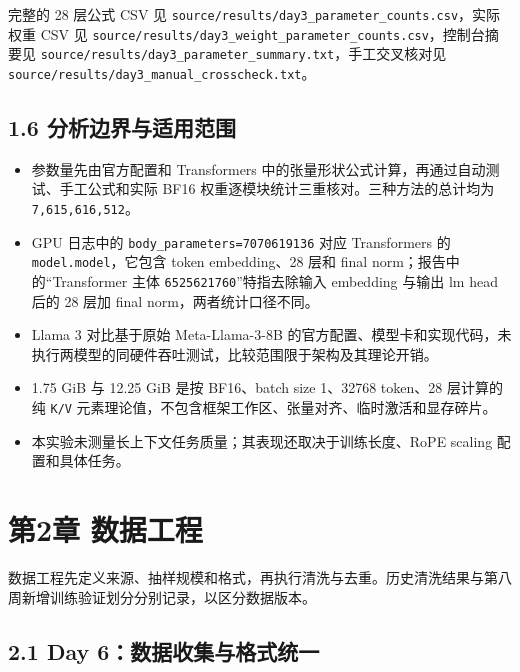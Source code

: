 \documentclass[UTF8,fontset=fandol,a4paper,11pt]{ctexart}
\providecommand{\tightlist}{\setlength{\itemsep}{0pt}\setlength{\parskip}{0pt}}
\begin{document}
完整的 28 层公式 CSV 见
\nolinkurl{source/results/day3_parameter_counts.csv}，实际权重 CSV 见
\nolinkurl{source/results/day3_weight_parameter_counts.csv}，控制台摘要见
\nolinkurl{source/results/day3_parameter_summary.txt}，手工交叉核对见
\nolinkurl{source/results/day3_manual_crosscheck.txt}。

\subsection{1.6 分析边界与适用范围}\label{ux5206ux6790ux8fb9ux754cux4e0eux9002ux7528ux8303ux56f4}

\begin{itemize}
\tightlist
\item
  参数量先由官方配置和 Transformers
  中的张量形状公式计算，再通过自动测试、手工公式和实际 BF16
  权重逐模块统计三重核对。三种方法的总计均为 \nolinkurl{7,615,616,512}。
\item
  GPU 日志中的 \nolinkurl{body_parameters=7070619136} 对应 Transformers
  的 \nolinkurl{model.model}，它包含 token embedding、28 层和 final
  norm；报告中的``Transformer 主体 \nolinkurl{6525621760}''特指去除输入
  embedding 与输出 lm head 后的 28 层加 final norm，两者统计口径不同。
\item
  Llama 3 对比基于原始 Meta-Llama-3-8B
  的官方配置、模型卡和实现代码，未执行两模型的同硬件吞吐测试，比较范围限于架构及其理论开销。
\item
  1.75 GiB 与 12.25 GiB 是按 BF16、batch size 1、32768 token、28
  层计算的纯 {\nolinkurl{K/V}}
  元素理论值，不包含框架工作区、张量对齐、临时激活和显存碎片。
\item
  本实验未测量长上下文任务质量；其表现还取决于训练长度、RoPE scaling
  配置和具体任务。
\end{itemize}

\section{第2章 数据工程}\label{ux7b2c2ux7ae0-ux6570ux636eux5de5ux7a0b}

数据工程先定义来源、抽样规模和格式，再执行清洗与去重。历史清洗结果与第八周新增训练验证划分分别记录，以区分数据版本。

\Needspace{185pt}

\subsection{2.1 Day 6：数据收集与格式统一}\label{day-6ux6570ux636eux6536ux96c6ux4e0eux683cux5f0fux7edfux4e00}
\end{document}
